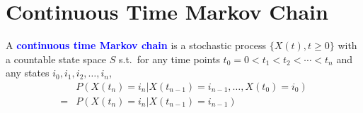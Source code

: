 \section{Continuous Time Markov Chain}
A \textbf{\textcolor{Blue}{continuous time Markov chain}} is a
stochastic process $\{X(t), t\geq 0\}$ with a countable state space $S$ s.t.\
for any time points $t_0=0<t_1<t_2<\cdots<t_{n}$ and any states $i_0, i_1, i_2,
\ldots, i_{n}$,
\begin{align*}
  &P\left( X\left( t_{n} \right) =i_{n} | X\left( t_{n-1} \right) =i_{n-1}, \ldots, X\left( t_0 \right) =i_0 \right) \\
  =&P\left( X\left( t_{n} \right) =i_{n} | X\left( t_{n-1} \right) =i_{n-1} \right) 
\end{align*}

